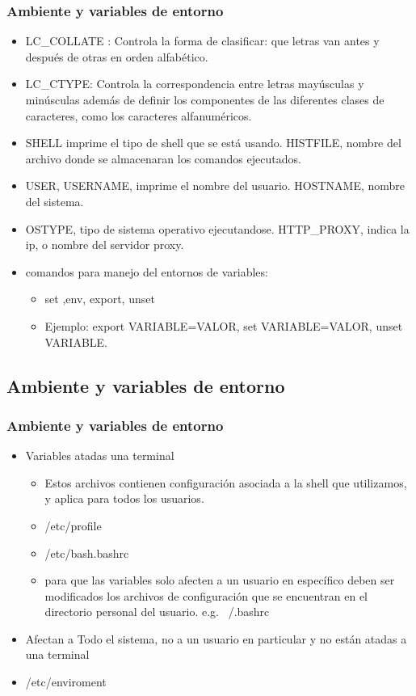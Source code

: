 \documentclass{beamer}
\begin{document}
\begin{frame}
\frametitle{Ambiente y variables de entorno}
	\begin{itemize}
		\item LC\_COLLATE : Controla la forma de clasificar: que letras van antes y despu\'es de otras en orden alfab\'etico.
		\item LC\_CTYPE: Controla la correspondencia entre letras may\'usculas y min\'usculas adem\'as de definir los componentes de las diferentes clases de caracteres, como los caracteres alfanum\'ericos. 
		\item SHELL imprime el tipo de shell que se est\'a usando. HISTFILE, nombre del archivo donde se almacenaran los comandos ejecutados.
		\item USER, USERNAME, imprime el nombre del usuario. HOSTNAME, nombre del sistema.
		\item OSTYPE, tipo de sistema operativo ejecutandose. HTTP\_PROXY, indica la ip, o nombre del servidor proxy.
		\item comandos para manejo del entornos de variables:
		\begin{itemize}
		\item set ,env,  export, unset
		\item Ejemplo:  export VARIABLE=VALOR, set VARIABLE=VALOR, unset VARIABLE.
		\end{itemize}
	\end{itemize}
\end{frame}

\subsection{Ambiente y variables de entorno}
\begin{frame}
\frametitle{Ambiente y variables de entorno}
        \begin{itemize}
                \item Variables atadas una terminal
		\begin{itemize}
			\item Estos archivos contienen configuraci\'on asociada a la shell que utilizamos, y aplica para todos los usuarios.
			\item /etc/profile
			\item /etc/bash.bashrc
			\item para que las variables solo afecten a un usuario en espec\'ifico deben ser modificados los archivos de configuraci\'on que se encuentran en el directorio personal del usuario. e.g. ~/.bashrc
		\end{itemize}
		\item Afectan a Todo el sistema, no a un usuario en particular y no están atadas a una terminal
			\item /etc/enviroment
        \end{itemize}
\end{frame}
\end{document}
